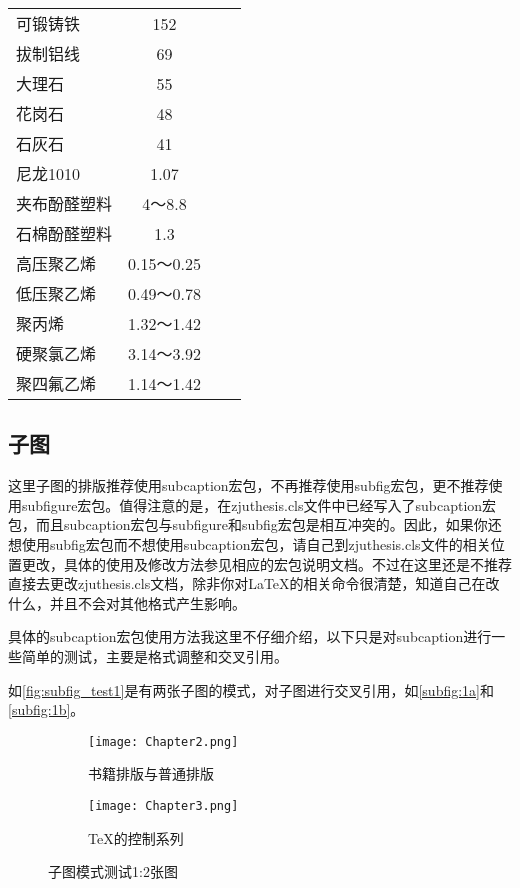 \begin{longtabu}{lccc}
可锻铸铁   & 152    &        &  \\
拔制铝线   & 69     &        &  \\
大理石    & 55     &        &  \\
花岗石    & 48     &        &  \\
石灰石    & 41     &        &  \\
尼龙1010 & 1.07   &        &  \\
夹布酚醛塑料 &  4～8.8 &        &  \\
石棉酚醛塑料 & 1.3    &        &  \\
高压聚乙烯  &  0.15～0.25 &        &  \\
低压聚乙烯  &  0.49～0.78 &        &  \\
聚丙烯    &  1.32～1.42 &        &  \\
硬聚氯乙烯  &  3.14～3.92 &        &  \\
聚四氟乙烯  &  1.14～1.42 &        &  \\
\end{longtabu}%

\subsection{子图}
这里子图的排版推荐使用subcaption宏包，不再推荐使用subfig宏包，更不推荐使用subfigure宏包。值得注意的是，在zjuthesis.cls文件中已经写入了subcaption宏包，而且subcaption宏包与subfigure和subfig宏包是相互冲突的。因此，如果你还想使用subfig宏包而不想使用subcaption宏包，请自己到zjuthesis.cls文件的相关位置更改，具体的使用及修改方法参见相应的宏包说明文档。不过在这里还是不推荐直接去更改zjuthesis.cls文档，除非你对\LaTeX 的相关命令很清楚，知道自己在改什么，并且不会对其他格式产生影响。

具体的subcaption宏包使用方法我这里不仔细介绍，以下只是对subcaption进行一些简单的测试，主要是格式调整和交叉引用。

如\autoref{fig:subfig_test1}是有两张子图的模式，对子图进行交叉引用，如\autoref{subfig:1a}和\autoref{subfig:1b}。

\begin{figure}[htbp]
	\centering
	\begin{subfigure}[b]{.4\textwidth}
		\centering
		\texttt{[image: Chapter2.png]}
		\caption{书籍排版与普通排版}\label{subfig:1a}
	\end{subfigure}
	\quad
	\begin{subfigure}[b]{.4\textwidth}
		\centering
		\texttt{[image: Chapter3.png]}
		\caption{\TeX 的控制系列}\label{subfig:1b}
	\end{subfigure}
	\caption{子图模式测试1:2张图}\label{fig:subfig_test1}
\end{figure}

